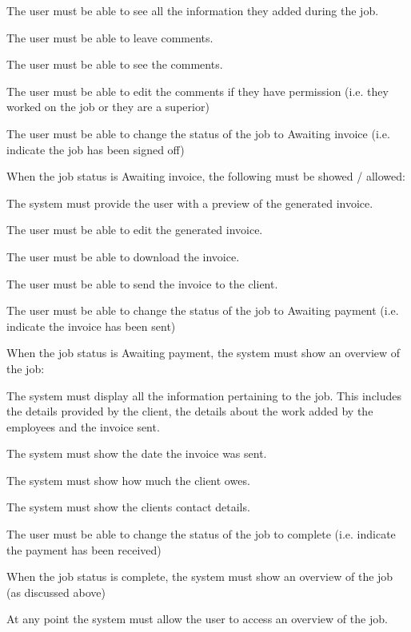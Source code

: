 \documentclass{article}
\begin{document}
\begin{list}{R.}{}
		\begin{list}{R.}{}
			\item The user must be able to see all the information they added during the job.
			\item The user must be able to leave comments.
			\item The user must be able to see the comments. 
			\item The user must be able to edit the comments if they have permission (i.e. they worked on the job or they are a superior)
			\item The user must be able to change the status of the job to Awaiting invoice (i.e. indicate the job has been signed off)
		\end{list}
		\item When the job status is Awaiting invoice, the following must be showed / allowed:
		\begin{list}{R.}{}
			\item The system must provide the user with a preview of the generated invoice. 
			\item The user must be able to edit the generated invoice. 
			\item The user must be able to download the invoice. 
			\item The user must be able to send the invoice to the client.
			\item The user must be able to change the status of the job to Awaiting payment (i.e. indicate the invoice has been sent)
		\end{list}
		\item When the job status is Awaiting payment, the system must show an overview of the job:
		\begin{list}{R.}{}
			\item The system must display all the information pertaining to the job. This includes the details provided by the client, the details about the work added by the employees and the invoice sent.
			\item The system must show the date the invoice was sent.
			\item The system must show how much the client owes.
			\item The system must show the clients contact details.
			\item The user must be able to change the status of the job to complete (i.e. indicate the payment has been received)			
		\end{list}
		\item When the job status is complete, the system must show an overview of the job (as discussed above)
		\item At any point the system must allow the user to access an overview of the job. 
	\end{list}
	
\end{document}
